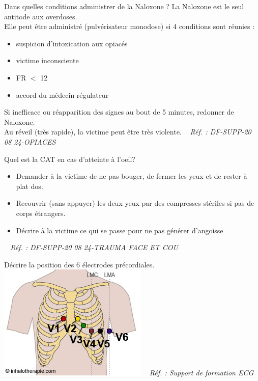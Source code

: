 \documentclass[grid,avery5371,landscape]{flashcards}
\makeatletter
\newcounter{nocarte}
\newcommand{\categ}[1]{%
  \def\@categ{#1}%
  \setcounter{nocarte}{0}%
}
\newcommand{\source}[1]{%
  \medskip
  \itshape%
   ~ \hfill Réf. : #1}
\makeatother
\begin{document}
\color[HTML]{FF6D01}
\categ{PSE+}
\begin{flashcard}[bilan]{
 Dans quelles conditions administrer de la Naloxone ?   }
  La Naloxone est le seul antitode aux overdoses. \\
  Elle peut être administré (pulvérisateur monodose) si 4 conditions sont réunies :
   \begin{itemize}
       \item suspicion d'intoxication aux opiacés
       \item victime inconsciente
       \item FR $<$ 12
       \item accord du médecin régulateur
   \end{itemize}
   Si inefficace ou réapparition des signes au bout de 5 minutes, redonner de Naloxone. \\
   Au réveil (très rapide), la victime peut être très violente.
  \source{DF-SUPP-20 08 24-OPIACES}
\end{flashcard}


\color[HTML]{FF6D01}
\categ{PSE+}
\begin{flashcard}[bilan]{
 Quel est la CAT en cas d'atteinte à l'oeil?    }
  \begin{itemize}
        \item Demander à la victime de ne pas bouger, de fermer les yeux et de rester à plat dos.
        \item Recouvrir (sans appuyer) les deux yeux par des compresses stériles si pas de corps étrangers.
        \item Décrire à la victime ce qui se passe pour ne pas générer d'angoisse
    \end{itemize}
  \source{DF-SUPP-20 08 24-TRAUMA FACE ET COU}
\end{flashcard}


\color[HTML]{FF6D01}
\categ{PSE+}
\begin{flashcard}[Geste]{
 Décrire la position des 6 électrodes précordiales.   }
  \includegraphics[scale=0.5]{derivations-precordiales.jpg}
  \source{Support de formation ECG}
\end{flashcard}
\end{document}
